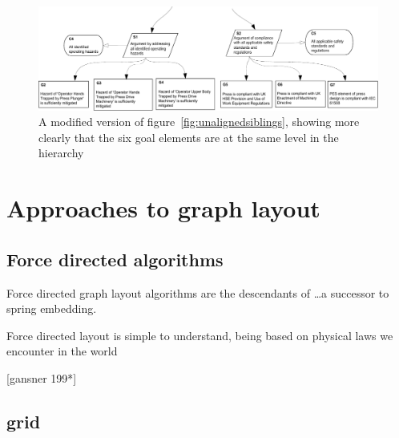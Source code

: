 \begin{figure}
    \includegraphics[width=\textwidth]{graphics/aligned_siblings.pdf}
    \caption{A modified version of figure~\ref{fig:unalignedsiblings},
            showing more clearly that the six goal elements are at the same level in the hierarchy}
    \label{fig:alignedsiblings}
\end{figure}










\section{Approaches to graph layout}

\subsection{Force directed algorithms}

Force directed graph layout algorithms are the descendants of  \citet{tutte} \ldots a successor to \citet{tutte} spring embedding.

Force directed layout is simple to understand, being based on physical laws we encounter in the world 


[gansner 199*]

\subsection{grid}




